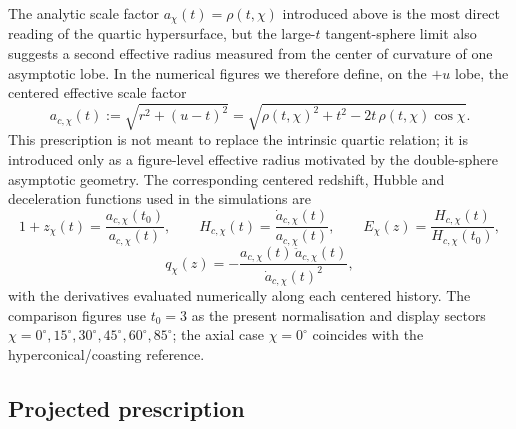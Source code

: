 \documentclass[3p,times,twocolumn]{elsarticle}
\begin{document}
The analytic scale factor $a_\chi(t)=\rho(t,\chi)$ introduced above is the most direct reading of the quartic hypersurface, but the large-$t$ tangent-sphere limit also suggests a second effective radius measured from the center of curvature of one asymptotic lobe. In the numerical figures we therefore define, on the $+u$ lobe, the centered effective scale factor
\begin{equation}
a_{c,\chi}(t):=\sqrt{r^2+(u-t)^2}
=\sqrt{\rho(t,\chi)^2+t^2-2t\,\rho(t,\chi)\cos\chi}.
\end{equation}
This prescription is not meant to replace the intrinsic quartic relation; it is introduced only as a figure-level effective radius motivated by the double-sphere asymptotic geometry. The corresponding centered redshift, Hubble and deceleration functions used in the simulations are
\begin{equation}
1+z_\chi(t)=\frac{a_{c,\chi}(t_0)}{a_{c,\chi}(t)},\qquad
H_{c,\chi}(t)=\frac{\dot a_{c,\chi}(t)}{a_{c,\chi}(t)},\qquad
E_\chi(z)=\frac{H_{c,\chi}(t)}{H_{c,\chi}(t_0)},
\end{equation}
\begin{equation}
q_\chi(z)=-\frac{a_{c,\chi}(t)\,\ddot a_{c,\chi}(t)}{\dot a_{c,\chi}(t)^2},
\end{equation}
with the derivatives evaluated numerically along each centered history. The comparison figures use $t_0=3$ as the present normalisation and display sectors $\chi=0^\circ,15^\circ,30^\circ,45^\circ,60^\circ,85^\circ$; the axial case $\chi=0^\circ$ coincides with the hyperconical/coasting reference.

\subsection{Projected prescription}
\end{document}
